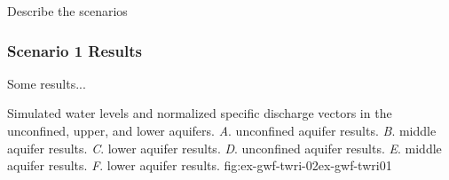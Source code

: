 Describe the scenarios


\subsubsection{Scenario 1 Results}

Some results...

\begin{StandardFigure}{
                                     Simulated water levels and normalized specific discharge vectors in 
                                     the unconfined, upper, and lower aquifers. 
                                     \textit{A}. \mf unconfined aquifer results.
                                     \textit{B}. \mf middle aquifer results.
                                     \textit{C}. \mf lower aquifer results.
                                     \textit{D}. \mff unconfined aquifer results.
                                     \textit{E}. \mff middle aquifer results.
                                     \textit{F}. \mff lower aquifer results.
                                     }{fig:ex-gwf-twri-02}{ex-gwf-twri01}
\end{StandardFigure}                                 

